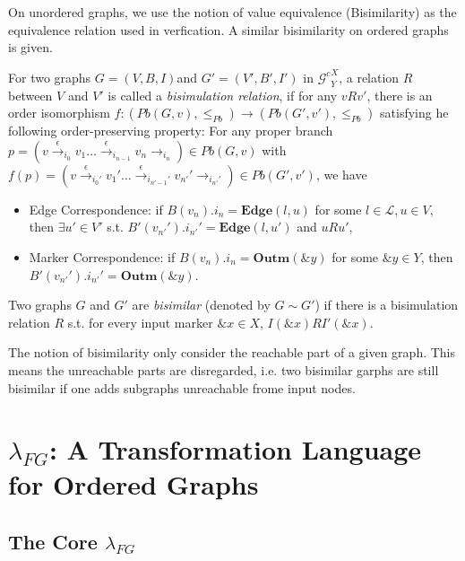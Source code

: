 \documentclass{llncs}
\newcommand{\act}[1]{{\xrightarrow{#1}{}}}
\newcommand{\Gc}{{\mathcal{G}^{c}}}
\begin{document}
On unordered graphs, we use the notion of value equivalence (Bisimilarity) as the equivalence relation used in verfication. A similar bisimilarity on ordered graphs is given.

For two graphs $G=(V,B,I)$and $G'=(V',B',I')$ in $\Gc^X_Y$, a relation $R$ between $V$ and $V'$ is called a \emph{bisimulation relation}, if for any $vRv'$, there is an order isomorphism $f:(Pb(G,v),\leq_{Pb})\rightarrow(Pb(G',v'),\leq_{Pb})$ satisfying he following order-preserving property: For any proper branch $p=(v\act{\epsilon}_{i_0}v_1\ldots\act{\epsilon}_{i_{n-1}}v_n\act{}_{i_n})\in Pb(G,v)$ with $f(p)=(v\act{\epsilon}_{i_0'}v_1'\ldots\act{\epsilon}_{i_{n'-1}'}v_{n'}'\act{}_{i_{n'}'})\in Pb(G',v')$, we have
\begin{itemize}
    \item Edge Correspondence: if $B(v_n).i_n=\mathbf{Edge}(l,u)$ for some $l\in\mathcal{L}, u\in V$, then  $\exists u'\in V'$ s.t. $B'(v_{n'}').i_{n'}'=\mathbf{Edge}(l,u')$ and $uRu'$,
    \item Marker Correspondence: if $B(v_n).i_n=\mathbf{Outm}(\&y)$ for some $\&y\in Y$, then $B'(v_{n'}').i_{n'}'=\mathbf{Outm}(\&y)$.
\end{itemize}
Two graphs $G$ and $G'$ are \emph{bisimilar} (denoted by $G\sim G'$) if there is a bisimulation relation $R$ s.t. for every input marker $\&x\in X$, $I(\&x)RI'(\&x)$.

The notion of bisimilarity only consider the reachable part of a given graph. This means the unreachable parts are disregarded, i.e. two bisimilar garphs are still bisimilar if one adds subgraphs unreachable frome input nodes.

\section{$\lambda_{FG}$: A Transformation Language for Ordered Graphs}\label{sec-lambda}

\subsection{The Core $\lambda_{FG}$}\label{subsec:core}
\end{document}
